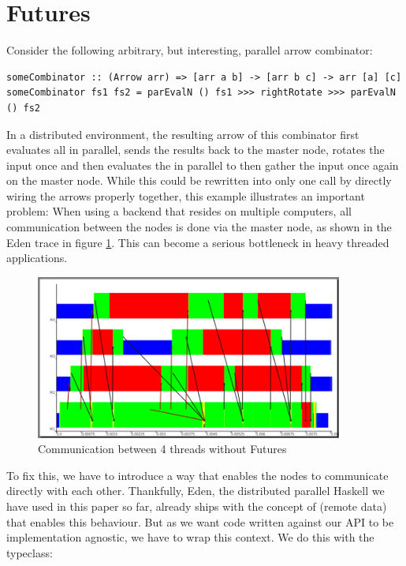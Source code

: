 \section{Futures} \label{futures}
Consider the following arbitrary, but interesting, parallel arrow combinator:
\begin{lstlisting}[frame=htrbl]
someCombinator :: (Arrow arr) => [arr a b] -> [arr b c] -> arr [a] [c]
someCombinator fs1 fs2 = parEvalN () fs1 >>> rightRotate >>> parEvalN () fs2
\end{lstlisting}
In a distributed environment, the resulting arrow of this combinator first evaluates all \code{[arr a b]} in parallel, sends the results back to the master node, rotates the input once and then evaluates the \code{[arr b c]} in parallel to then gather the input once again on the master node. While this could be rewritten into only one  call by directly wiring the arrows properly together, this example illustrates an important problem: When using a  backend that resides on multiple computers, all communication between the nodes is done via the master node, as shown in the Eden trace in figure \ref{fig:withoutFutures}. This can become a serious bottleneck in heavy threaded applications.
\begin{figure}[ht]
	\centering
	\includegraphics[width=0.9\textwidth]{images/withoutFutures}
	\caption[without Futures]{Communication between 4 threads without Futures}
	\label{fig:withoutFutures}
\end{figure}
To fix this, we have to introduce a way that enables the nodes to communicate directly with each other. Thankfully, Eden, the distributed parallel Haskell we have used in this paper so far, already ships with the concept of  (remote data) that enables this behaviour. But as we want code written against our API to be implementation agnostic, we have to wrap this context. We do this with the  typeclass:

